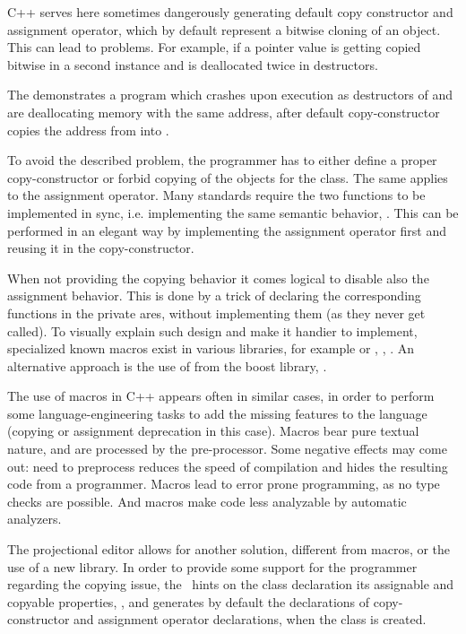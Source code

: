 C++ serves here sometimes dangerously generating default copy constructor and assignment operator, which by default represent
a bitwise cloning of an object. This can lead to problems. For example, if a pointer value is getting copied bitwise in a second
instance and is deallocated twice in destructors.


The  demonstrates a program which crashes upon execution as destructors of  and  are deallocating 
memory with the same address, after default copy-constructor copies the address from  into .

To avoid the described problem, the programmer has to either define a proper copy-constructor or forbid copying of the objects for
the class. The same applies to the assignment operator. Many standards require the two functions to be implemented in sync, i.e. 
implementing the same semantic behavior, \cite{ooocpp}. This can be performed in an elegant way by implementing the assignment 
operator first and reusing it in  the copy-constructor.

When not providing the copying behavior it comes logical to disable also the assignment behavior. 
This is done by a trick of declaring the corresponding functions in the private ares, without implementing them
(as they never get called). To visually explain such design and make it handier to implement, specialized known macros exist in 
various libraries, for example  or , \cite{googlecppstyle}, \cite{qobjref}.
An alternative approach is the use of  from the 
boost library, \cite{boost}.

The use of macros in C++ appears often in similar cases, in order to perform some language-engineering tasks to add the missing
features to the language (copying or assignment deprecation in this case). 
Macros bear pure textual nature, and are processed by the pre-processor. Some negative effects may 
come out: need to preprocess reduces the speed of compilation and hides the resulting code from a programmer. Macros lead
to error prone programming, as no type checks are possible. And macros make code less analyzable by automatic analyzers.

\pcppsolution



The projectional editor allows for another solution, different from macros, or the use of a new library.  
In order to provide some support for the  programmer regarding the copying issue, the \pcpp\ hints on the class declaration its 
assignable and copyable properties, , and generates by default the declarations of copy-constructor and assignment operator 
declarations, when the class is created.

